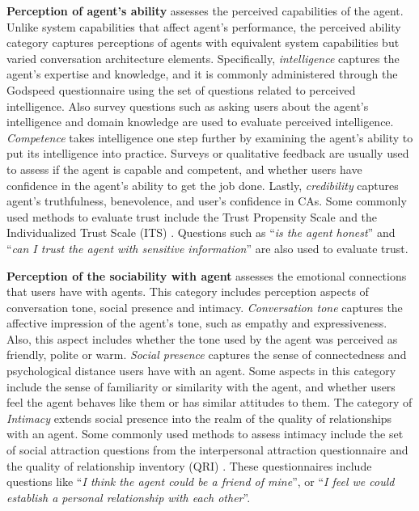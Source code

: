\textbf{Perception of agent's ability} assesses the perceived capabilities of the agent. Unlike system capabilities that affect agent's performance, the perceived ability category captures perceptions of agents with equivalent system capabilities but varied conversation architecture elements. Specifically, \textit{intelligence} captures the agent's expertise and knowledge, and it is commonly administered through the Godspeed questionnaire \cite{bartneck2009measurement} using the set of questions related to perceived intelligence. Also survey questions such as asking users about the agent's intelligence and domain knowledge are used to evaluate perceived intelligence. \textit{Competence} takes intelligence one step further by examining the agent's ability to put its intelligence into practice. Surveys or qualitative feedback are usually used to assess if the agent is capable and competent, and whether users have confidence in the agent's ability to get the job done. Lastly, \textit{credibility} captures agent's truthfulness, benevolence, and user's confidence in CAs. Some commonly used methods to evaluate trust include the Trust Propensity Scale \cite{mayer1999effect} and the Individualized Trust Scale (ITS) \cite{wheeless1977measurement}. Questions such as ``\textit{is the agent honest}'' and ``\textit{can I trust the agent with sensitive information}'' are also used to evaluate trust.

\textbf{Perception of the sociability with agent} assesses the emotional connections that users have with agents. This category includes perception aspects of conversation tone, social presence and intimacy. \textit{Conversation tone} captures the affective impression of the agent's tone, such as empathy and expressiveness. Also, this aspect includes whether the tone used by the agent was perceived as friendly, polite or warm. \textit{Social presence} captures the sense of connectedness and psychological distance users have with an agent. Some aspects in this category include the sense of familiarity or similarity with the agent, and whether users feel the agent behaves like them or has similar attitudes to them. The category of \textit{Intimacy} extends social presence into the realm of the quality of relationships with an agent. Some commonly used methods to assess intimacy include the set of social attraction questions from the interpersonal attraction questionnaire \cite{mccroskey1975development} and the quality of relationship inventory (QRI) \cite{pierce1997assessing}. These questionnaires include questions like ``\textit{I think the agent could be a friend of mine}'', or ``\textit{I feel we could establish a personal relationship with each other}''.

